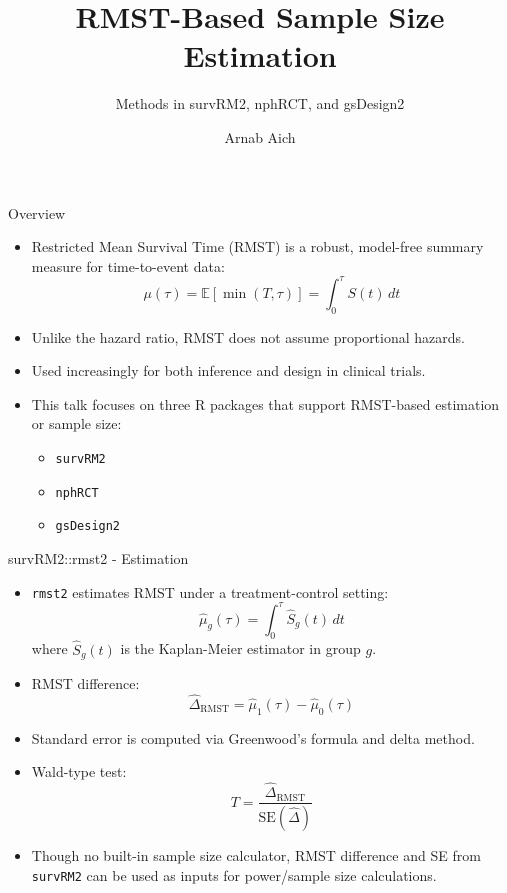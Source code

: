 \documentclass{beamer}
\title{RMST-Based Sample Size Estimation}
\subtitle{Methods in survRM2, nphRCT, and gsDesign2}
\author{Arnab Aich}
\institute{UTHSC-PM}
\begin{document}
\frame{\titlepage}

\begin{frame}{Overview}
\begin{itemize}
    \item Restricted Mean Survival Time (RMST) is a robust, model-free summary measure for time-to-event data:
    \[
    \mu(\tau) = \mathbb{E}[\min(T, \tau)] = \int_0^\tau S(t) \, dt
    \]
    \item Unlike the hazard ratio, RMST does not assume proportional hazards.
    \item Used increasingly for both inference and design in clinical trials.
    \item This talk focuses on three R packages that support RMST-based estimation or sample size:
    \begin{itemize}
        \item \texttt{survRM2}
        \item \texttt{nphRCT}
        \item \texttt{gsDesign2}
    \end{itemize}
\end{itemize}
\end{frame}

\begin{frame}{survRM2::rmst2 - Estimation}
\begin{itemize}
    \item \texttt{rmst2} estimates RMST under a treatment-control setting:
    \[
    \hat{\mu}_g(\tau) = \int_0^\tau \hat{S}_g(t) \, dt
    \]
    where $\hat{S}_g(t)$ is the Kaplan-Meier estimator in group $g$.
    
    \item RMST difference: 
    \[
    \hat{\Delta}_{\text{RMST}} = \hat{\mu}_1(\tau) - \hat{\mu}_0(\tau)
    \]
    
    \item Standard error is computed via Greenwood's formula and delta method.
    
    \item Wald-type test:
    \[
    T = \frac{\hat{\Delta}_{\text{RMST}}}{\text{SE}(\hat{\Delta})}
    \]
    
    \item Though no built-in sample size calculator, RMST difference and SE from \texttt{survRM2} can be used as inputs for power/sample size calculations.
\end{itemize}
\end{frame}
\end{document}
